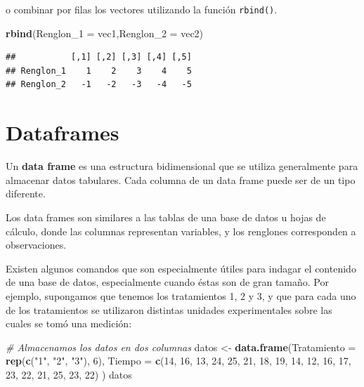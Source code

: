 \documentclass[
]{book}
\newenvironment{Shaded}{\begin{snugshade}}{\end{snugshade}}
\newcommand{\AttributeTok}[1]{\textcolor[rgb]{0.13,0.29,0.53}{#1}}
\newcommand{\CommentTok}[1]{\textcolor[rgb]{0.56,0.35,0.01}{\textit{#1}}}
\newcommand{\DecValTok}[1]{\textcolor[rgb]{0.00,0.00,0.81}{#1}}
\newcommand{\FunctionTok}[1]{\textcolor[rgb]{0.13,0.29,0.53}{\textbf{#1}}}
\newcommand{\NormalTok}[1]{#1}
\newcommand{\OtherTok}[1]{\textcolor[rgb]{0.56,0.35,0.01}{#1}}
\newcommand{\StringTok}[1]{\textcolor[rgb]{0.31,0.60,0.02}{#1}}
\begin{document}
o combinar por filas los vectores utilizando la función \texttt{rbind()}.

\begin{Shaded}
\begin{Highlighting}[]
\FunctionTok{rbind}\NormalTok{(}\AttributeTok{Renglon\_1 =}\NormalTok{ vec1,}\AttributeTok{Renglon\_2 =}\NormalTok{ vec2)}
\end{Highlighting}
\end{Shaded}

\begin{verbatim}
##           [,1] [,2] [,3] [,4] [,5]
## Renglon_1    1    2    3    4    5
## Renglon_2   -1   -2   -3   -4   -5
\end{verbatim}

\hypertarget{dataframes}{%
\section{Dataframes}\label{dataframes}}

Un \textbf{data frame} es una estructura bidimensional que se utiliza generalmente para almacenar datos tabulares. Cada columna de un data frame puede ser de un tipo diferente.

Los data frames son similares a las tablas de una base de datos u hojas de cálculo, donde las columnas representan variables, y los renglones corresponden a observaciones.

Existen algunos comandos que son especialmente útiles para indagar el contenido de una base de datos, especialmente cuando éstas son de gran tamaño.
Por ejemplo, supongamos que tenemos los tratamientos 1, 2 y 3, y que para cada uno de los tratamientos se utilizaron distintas unidades experimentales sobre las cuales se tomó una medición:

\begin{Shaded}
\begin{Highlighting}[]
\CommentTok{\# Almacenamos los datos en dos columnas}
\NormalTok{datos }\OtherTok{\textless{}{-}} \FunctionTok{data.frame}\NormalTok{(}\AttributeTok{Tratamiento =} \FunctionTok{rep}\NormalTok{(}\FunctionTok{c}\NormalTok{(}\StringTok{"1"}\NormalTok{, }\StringTok{"2"}\NormalTok{, }\StringTok{"3"}\NormalTok{), }\DecValTok{6}\NormalTok{), }
                    \AttributeTok{Tiempo =} \FunctionTok{c}\NormalTok{(}\DecValTok{14}\NormalTok{, }\DecValTok{16}\NormalTok{, }\DecValTok{13}\NormalTok{, }
                               \DecValTok{24}\NormalTok{, }\DecValTok{25}\NormalTok{, }\DecValTok{21}\NormalTok{, }
                               \DecValTok{18}\NormalTok{, }\DecValTok{19}\NormalTok{, }\DecValTok{14}\NormalTok{, }
                               \DecValTok{12}\NormalTok{, }\DecValTok{16}\NormalTok{, }\DecValTok{17}\NormalTok{, }
                               \DecValTok{23}\NormalTok{, }\DecValTok{22}\NormalTok{, }\DecValTok{21}\NormalTok{, }
                               \DecValTok{25}\NormalTok{, }\DecValTok{23}\NormalTok{, }\DecValTok{22}\NormalTok{)}
\NormalTok{                    )}
\NormalTok{datos}
\end{Highlighting}
\end{Shaded}
\end{document}
